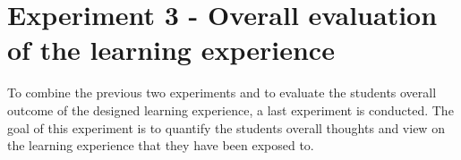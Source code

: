 \section{Experiment 3 - Overall evaluation of the learning experience}

To combine the previous two experiments and to evaluate the students overall outcome of the designed learning experience, a last experiment is conducted. The goal of this experiment is to quantify the students overall thoughts and view on the learning experience that they have been exposed to. \\

